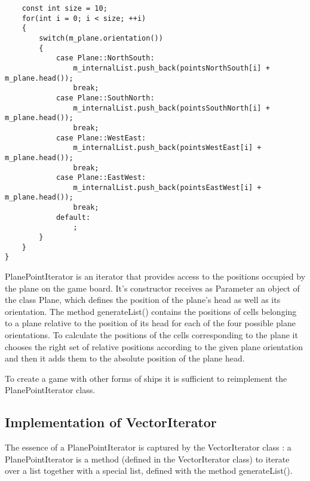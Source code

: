 \begin{lstlisting}
    const int size = 10;
    for(int i = 0; i < size; ++i)
    {
        switch(m_plane.orientation())
        {
            case Plane::NorthSouth:
                m_internalList.push_back(pointsNorthSouth[i] + m_plane.head());
                break;
            case Plane::SouthNorth:
                m_internalList.push_back(pointsSouthNorth[i] + m_plane.head());
                break;
            case Plane::WestEast:
                m_internalList.push_back(pointsWestEast[i] + m_plane.head());
                break;
            case Plane::EastWest:
                m_internalList.push_back(pointsEastWest[i] + m_plane.head());
                break;
            default:
                ;
        }
    }
}
\end{lstlisting}

PlanePointIterator is an iterator that provides access to the positions occupied by the plane on the game board. It's constructor receives as Parameter an object of the class Plane, which defines the position of the plane's head as well as its orientation. The method generateList() contains the positions of cells belonging to a plane relative to the position of its head for each of the four possible plane orientations. To calculate the positions of the cells corresponding to the plane it chooses the right set of relative positions according to the given plane orientation and then it adds them to the absolute position of the plane head.

To create a game with other forms of ships it is sufficient to reimplement the PlanePointIterator class.

\subsection {Implementation of VectorIterator} \label {VectItImpl}

The essence of a PlanePointIterator is captured by the VectorIterator class : a PlanePointIterator is a method (defined in the VectorIterator class) to iterate over a list together with a special list, defined with the method generateList().

